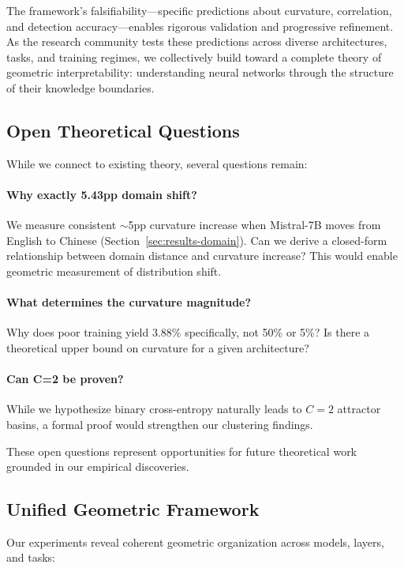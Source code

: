 \documentclass[11pt]{article}
\begin{document}
The framework's falsifiability—specific predictions about curvature, correlation, and detection accuracy—enables rigorous validation and progressive refinement. As the research community tests these predictions across diverse architectures, tasks, and training regimes, we collectively build toward a complete theory of geometric interpretability: understanding neural networks through the structure of their knowledge boundaries.

\subsection{Open Theoretical Questions}

While we connect to existing theory, several questions remain:

\paragraph{Why exactly 5.43pp domain shift?}
We measure consistent $\sim$5pp curvature increase when Mistral-7B moves from English to Chinese (Section~\ref{sec:results-domain}). Can we derive a closed-form relationship between domain distance and curvature increase? This would enable geometric measurement of distribution shift.

\paragraph{What determines the curvature magnitude?}
Why does poor training yield 3.88\% specifically, not 50\% or 5\%? Is there a theoretical upper bound on curvature for a given architecture?

\paragraph{Can C=2 be proven?}
While we hypothesize binary cross-entropy naturally leads to $C=2$ attractor basins, a formal proof would strengthen our clustering findings.

These open questions represent opportunities for future theoretical work grounded in our empirical discoveries.

\subsection{Unified Geometric Framework}

Our experiments reveal coherent geometric organization across models, layers, and tasks:
\end{document}
